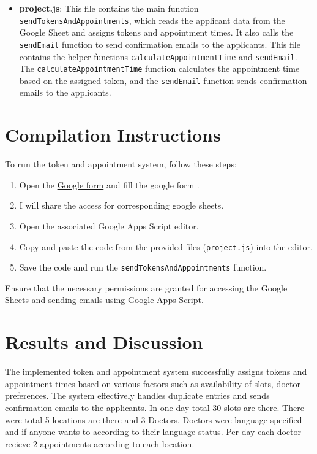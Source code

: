 \documentclass[a4paper, 12pt]{article}
\begin{document}
\begin{itemize}
    \item \textbf{project.js}: This file contains the main function \texttt{sendTokensAndAppointments}, which reads the applicant data from the Google Sheet and assigns tokens and appointment times. It also calls the \texttt{sendEmail} function to send confirmation emails to the applicants. This file contains the helper functions \texttt{calculateAppointmentTime} and \texttt{sendEmail}. The \texttt{calculateAppointmentTime} function calculates the appointment time based on the assigned token, and the \texttt{sendEmail} function sends confirmation emails to the applicants.
\end{itemize}

\section{Compilation Instructions}
To run the token and appointment system, follow these steps:

\begin{enumerate}
        \item Open the \href{https://forms.gle/JCb4TP7xBunpTqg99}{Google form} and fill the google form .
        \item I will share the access for corresponding google sheets.
    \item Open the associated Google Apps Script editor.
    \item Copy and paste the code from the provided files (\texttt{project.js}) into the editor.
    \item Save the code and run the \texttt{sendTokensAndAppointments} function.
\end{enumerate}

Ensure that the necessary permissions are granted for accessing the Google Sheets and sending emails using Google Apps Script.

\section{Results and Discussion}
The implemented token and appointment system successfully assigns tokens and appointment times based on various factors such as availability of slots, doctor preferences. The system effectively handles duplicate entries and sends confirmation emails to the applicants. In one day total 30 slots are there. There were total 5 locations are there and 3 Doctors. Doctors were language specified and if anyone wants to according to their language status. Per day each doctor recieve 2 appointments according to each location.
\end{document}
